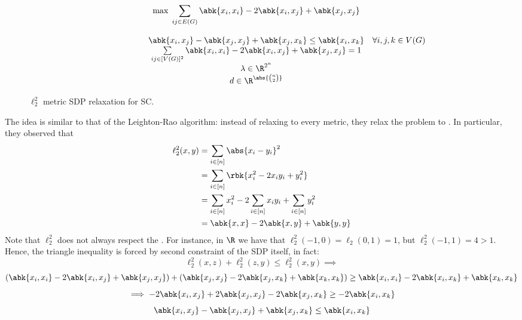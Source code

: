 \documentclass[a4paper, 12pt]{report}
\begin{document}
    \begin{figure}[H]
        \centering
        \[\begin{array}{ccl}
            \qquad\qquad\quad
            & \max \; \displaystyle \sum_{ij \in E(G)}{\abk{x_i,x_i} - 2 \abk{x_i,x_j} + \abk{x_j,x_j}} \\\\
            & \abk{x_i, x_j} - \abk{x_j, x_j} + \abk{x_j, x_k} \le \abk{x_i, x_k} & \forall i, j ,k \in V(G) \\
            & \sum\limits_{ij \in [V(G)]^2}{\abk{x_i,x_i} - 2 \abk{x_i,x_j} + \abk{x_j,x_j}} = 1 \\
            & \lambda \in \R^{2^n} \\
            & d \in \R^{\abs{\binom{n}{2}}} \\
        \end{array}\]
        \caption{$\ell_2^2$ metric SDP relaxation for SC.}
    \end{figure}

    The idea is similar to that of the Leighton-Rao algorithm: instead of relaxing to every metric, they relax the problem to . In particular, they observed that
    \begin{equation*}
        \begin{split}
            \ell_2^2(x, y) &= \sum_{i \in [n]}{\abs{x_i - y_i}^2} \\
                           &= \sum_{i \in [n]}{\rbk{x_i^2 - 2x_iy_i + y_i^2}} \\
                           &= \sum_{i \in [n]}{x_i^2 - 2\sum_{i \in [n]}{x_iy_i} + \sum_{i \in [n]}{y_i^2}} \\
                           &= \abk{x,x} - 2 \abk{x,y} + \abk{y,y}
        \end{split}
    \end{equation*}
    Note that $\ell_2^2$ does not always respect the . For instance, in $\R$ we have that $\ell_2^2(-1, 0) = \ell_2(0, 1) = 1$, but $\ell_2^2(-1, 1) = 4 > 1$. Hence, the triangle inequality is forced by second constraint of the SDP itself, in fact: $$\ell_2^2(x, z) + \ell_2^2(z, y) \le \ell_2^2(x, y) \implies$$ $$(\abk{x_i, x_i} - 2\abk{x_i, x_j} + \abk{x_j, x_j}) + (\abk{x_j, x_j} - 2\abk{x_j , x_k} + \abk{x_k, x_k}) \ge \abk{x_i, x_i} - 2 \abk{x_i, x_k} + \abk{x_k, x_k}$$ $$\implies -2 \abk{x_i, x_j} + 2\abk{x_j , x_j} - 2 \abk{x_j , x_k } \ge -2 \abk{x_i , x_k}$$ $$\abk{x_i, x_j} - \abk{x_j , x_j} + \abk{x_j , x_k} \le \abk{x_i, x_k}$$
\end{document}
